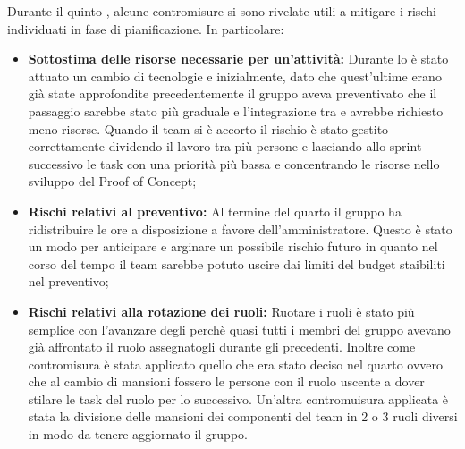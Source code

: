 \vspace{0.5\baselineskip}
\par Durante il quinto , alcune contromisure si sono rivelate utili a mitigare i rischi individuati in fase di pianificazione. In particolare:
\begin{itemize}
  \item \textbf{Sottostima delle risorse necessarie per un'attività:} Durante lo  è stato attuato un cambio di tecnologie e inizialmente, dato che quest'ultime erano già state approfondite precedentemente il gruppo aveva preventivato che il passaggio sarebbe stato più graduale e l'integrazione tra  e  avrebbe richiesto meno risorse. Quando il team si è accorto il rischio è stato gestito correttamente dividendo il lavoro tra più persone e lasciando allo sprint successivo le task con una priorità più bassa e concentrando le risorse nello sviluppo del Proof of Concept;
  \item \textbf{Rischi relativi al preventivo:} Al termine del quarto  il gruppo ha ridistribuire le ore a disposizione a favore dell'amministratore. Questo è stato un modo per anticipare e arginare un possibile rischio futuro in quanto nel corso del tempo il team sarebbe potuto uscire dai limiti del budget staibiliti nel preventivo;
  \item \textbf{Rischi relativi alla rotazione dei ruoli:} Ruotare i ruoli è stato più semplice con l'avanzare degli  perchè quasi tutti i membri del gruppo avevano già affrontato il ruolo assegnatogli durante gli  precedenti. Inoltre come contromisura è stata applicato quello che era stato deciso nel quarto  ovvero che al cambio di mansioni fossero le persone con il ruolo uscente a dover stilare le task del ruolo per lo  successivo. Un'altra contromuisura applicata è stata la divisione delle mansioni dei componenti del team in 2 o 3 ruoli diversi in modo da tenere aggiornato il gruppo.
\end{itemize}

